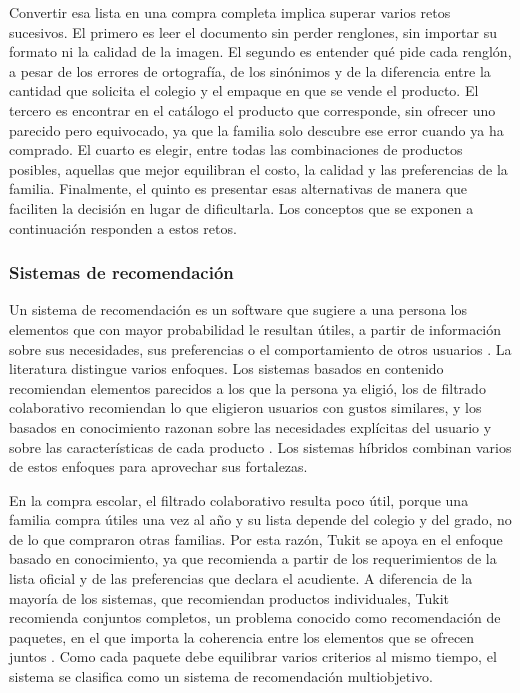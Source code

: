 Convertir esa lista en una compra completa implica superar varios retos sucesivos. El
primero es leer el documento sin perder renglones, sin importar su formato ni la calidad de
la imagen. El segundo es entender qué pide cada renglón, a pesar de los errores de
ortografía, de los sinónimos y de la diferencia entre la cantidad que solicita el colegio y
el empaque en que se vende el producto. El tercero es encontrar en el catálogo el producto
que corresponde, sin ofrecer uno parecido pero equivocado, ya que la familia solo descubre
ese error cuando ya ha comprado. El cuarto es elegir, entre todas las combinaciones de
productos posibles, aquellas que mejor equilibran el costo, la calidad y las preferencias de
la familia. Finalmente, el quinto es presentar esas alternativas de manera que faciliten la
decisión en lugar de dificultarla. Los conceptos que se exponen a continuación responden a
estos retos.\par

\subsubsection{Sistemas de recomendación}

Un sistema de recomendación es un software que sugiere a una persona los elementos que con
mayor probabilidad le resultan útiles, a partir de información sobre sus necesidades, sus
preferencias o el comportamiento de otros usuarios \citep{adomavicius_toward_2005}. La
literatura distingue varios enfoques. Los sistemas basados en contenido recomiendan
elementos parecidos a los que la persona ya eligió, los de filtrado colaborativo recomiendan
lo que eligieron usuarios con gustos similares, y los basados en conocimiento razonan sobre
las necesidades explícitas del usuario y sobre las características de cada producto
\citep{burke_hybrid_2002}. Los sistemas híbridos combinan varios de estos enfoques para
aprovechar sus fortalezas.\par

En la compra escolar, el filtrado colaborativo resulta poco útil, porque una familia compra
útiles una vez al año y su lista depende del colegio y del grado, no de lo que compraron
otras familias. Por esta razón, Tukit se apoya en el enfoque basado en conocimiento, ya que
recomienda a partir de los requerimientos de la lista oficial y de las preferencias que
declara el acudiente. A diferencia de la mayoría de los sistemas, que recomiendan productos
individuales, Tukit recomienda conjuntos completos, un problema conocido como recomendación
de paquetes, en el que importa la coherencia entre los elementos que se ofrecen juntos
\citep{avny_brosh_bruce_2022}. Como cada paquete debe equilibrar varios criterios al mismo
tiempo, el sistema se clasifica como un sistema de recomendación multiobjetivo.\par


